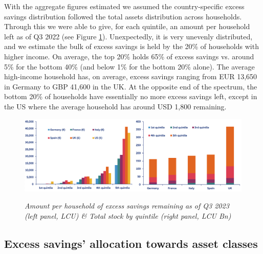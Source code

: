 With the aggregate figures estimated we assumed the country-specific excess savings distribution followed the total assets distribution across households. 
Through this we were able to give, for each quintile, an amount per household left as of Q3 2022 (see Figure \ref{figure:Savings}). 
Unexpectedly, it is very unevenly distributed, and we estimate the bulk of excess savings is held by the 20\% of households with higher income. 
On average, the top 20\% holds 65\% of excess savings vs. around 5\% for the bottom 40\% (and below 1\% for the bottom 20\% alone). 
The average high-income household has, on average, excess savings ranging from EUR 13,650 in Germany to GBP 41,600 in the UK. 
At the opposite end of the spectrum, the bottom 20\% of households have essentially no more excess savings left, except in the US where the average household has around USD 1,800 remaining. 

\begin{figure}[H]
    \centering
    \caption{\textit{Amount per household of excess savings remaining as of Q3 2023 (left panel, LCU) \& Total stock by quintile (right panel, LCU Bn)}}
    \includegraphics[width=1\textwidth]{Core/1.Savings/img/xSavings.png}
    \label{figure:Savings}
\end{figure}

\newpage

\subsection{Excess savings' allocation towards asset classes}

